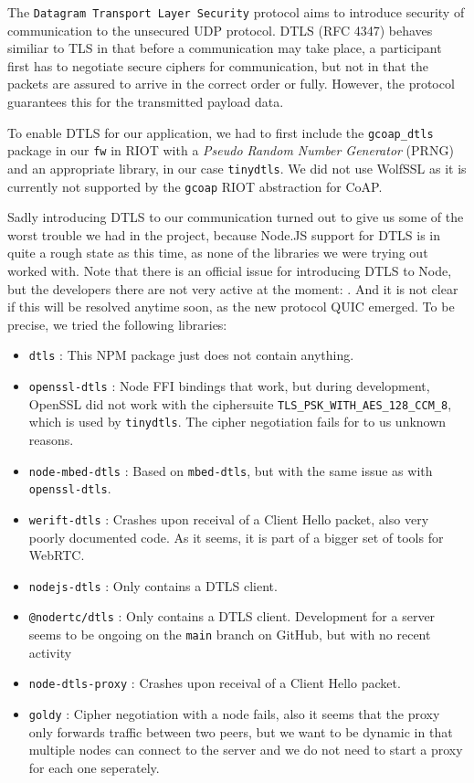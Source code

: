 \documentclass[acmtog, language=english, nonacm]{acmart}
\begin{document}
    The \texttt{Datagram Transport Layer Security} protocol aims to introduce security of communication to the unsecured UDP protocol. DTLS (RFC 4347) behaves similiar to TLS in that before a communication may take place, a participant first has to negotiate secure ciphers for communication, but not in that the packets are assured to arrive in the correct order or fully. However, the protocol guarantees this for the transmitted payload data.

    To enable DTLS for our application, we had to first include the \texttt{gcoap\_dtls} package in our \texttt{fw} in RIOT with a \emph{Pseudo Random Number Generator} (PRNG) and an appropriate library, in our case \texttt{tinydtls}. We did not use WolfSSL as it is currently not supported by the \texttt{gcoap} RIOT abstraction for CoAP.
    
    Sadly introducing DTLS to our communication turned out to give us some of the worst trouble we had in the project, because Node.JS support for DTLS is in quite a rough state as this time, as none of the libraries we were trying out worked with. Note that there is an official issue for introducing DTLS to Node, but the developers there are not very active at the moment: \cite{node-dtls-issue}. And it is not clear if this will be resolved anytime soon, as the new protocol QUIC emerged. To be precise, we tried the following libraries:

    \begin{itemize}
        \item \texttt{dtls} \cite{npm-dtls}: This NPM package just does not contain anything. 
        \item \texttt{openssl-dtls} \cite{npm-openssl-dtls}: Node FFI bindings that work, but during development, OpenSSL did not work with the ciphersuite \texttt{TLS\_PSK\_WITH\_AES\_128\_CCM\_8}, which is used by \texttt{tinydtls}. The cipher negotiation fails for to us unknown reasons.
        \item \texttt{node-mbed-dtls} \cite{npm-node-mbed-dtls}: Based on \texttt{mbed-dtls}, but with the same issue as with \texttt{openssl-dtls}.
        \item \texttt{werift-dtls} \cite{npm-werift-dtls}: Crashes upon receival of a Client Hello packet, also very poorly documented code. As it seems, it is part of a bigger set of tools for WebRTC.
        \item \texttt{nodejs-dtls} \cite{npm-nodejs-dtls}: Only contains a DTLS client.
        \item \texttt{@nodertc/dtls} \cite{npm-nodertc-dtls}: Only contains a DTLS client. Development for a server seems to be ongoing on the \texttt{main} branch on GitHub, but with no recent activity
        \item \texttt{node-dtls-proxy} \cite{npm-node-dtls-proxy}: Crashes upon receival of a Client Hello packet.
        \item \texttt{goldy} \cite{github-goldy}: Cipher negotiation with a node fails, also it seems that the proxy only forwards traffic between two peers, but we want to be dynamic in that multiple nodes can connect to the server and we do not need to start a proxy for each one seperately.
    \end{itemize}
\end{document}
